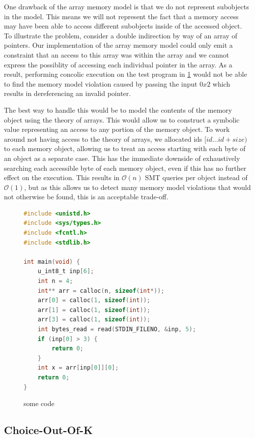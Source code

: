 \documentclass[12pt,twoside]{report}
\begin{document}
One drawback of the array memory model is that we do not represent subobjects in the model. This means we will not represent the fact that a memory access may have been able to access different subobjects inside of the accessed object. To illustrate the problem, consider a double indirection by way of an array of pointers. Our implementation of the array memory model could only emit a constraint that an access to this array was within the array and we cannot express the possiblity of accessing each individual pointer in the array. As a result, performing concolic execution on the test program in \ref{DoubleIndirection} would not be able to find the memory model violation caused by passing the input $0x2$ which results in dereferencing an invalid pointer.

The best way to handle this would be to model the contents of the memory object using the theory of arrays. This would allow us to construct a symbolic value representing an access to any portion of the memory object.
To work around not having access to the theory of arrays, we allocated ids $[id \dots id + size)$ to each memory object, allowing us to treat an access starting with each byte of an object as a separate case. This has the immediate downside of exhaustively searching each accessible byte of each memory object, even if this has no further effect on the execution. This results in $\mathcal{O}(n)$ SMT queries per object instead of $\mathcal{O}(1)$, but as this allows us to detect many memory model violations that would not otherwise be found, this is an acceptable trade-off.

\begin{figure}
    \centering
    \begin{lstlisting}[language=C]
#include <unistd.h>
#include <sys/types.h>
#include <fcntl.h>
#include <stdlib.h>

int main(void) {
    u_int8_t inp[6];
    int n = 4;
    int** arr = calloc(n, sizeof(int*));
    arr[0] = calloc(1, sizeof(int));
    arr[1] = calloc(1, sizeof(int));
    arr[3] = calloc(1, sizeof(int));
    int bytes_read = read(STDIN_FILENO, &inp, 5);
    if (inp[0] > 3) {
        return 0;
    }
    int x = arr[inp[0]][0];
    return 0;
}
\end{lstlisting}
    \caption{some code}
    \label{DoubleIndirection}
\end{figure}



\subsection{Choice-Out-Of-K}
\end{document}
